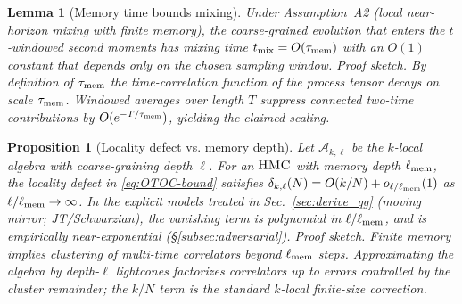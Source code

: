 \documentclass[aps,prd,preprint,onecolumn,superscriptaddress,nofootinbib,longbibliography,floatfix,11pt,showpacs,showkeys]{revtex4-2}
\newcommand{\HMC}{\textsc{HMC}\xspace}
\theoremstyle{plain}
\newtheorem{lemma}[theorem]{Lemma}
\newtheorem{proposition}[theorem]{Proposition}
\theoremstyle{definition}
\theoremstyle{remark}
\begin{document}
\begin{lemma}[Memory time bounds mixing]
\label{lem:mem-to-mix}
Under Assumption~A2 (local near-horizon mixing with finite memory), the coarse-grained evolution that enters the $t$-windowed second moments
has mixing time $t_{\rm mix}=O(\tau_{\rm mem})$ with an $O(1)$ constant that depends only on the chosen sampling window.
\emph{Proof sketch.} By definition of $\tau_{\rm mem}$ the time-correlation function of the process tensor decays on scale $\tau_{\rm mem}$.
Windowed averages over length $T$ suppress connected two-time contributions by $O(e^{-T/\tau_{\rm mem}})$, yielding the claimed scaling.
\end{lemma}

\begin{proposition}[Locality defect vs. memory depth]
\label{prop:delta-locality}
Let $\mathscr A_{k,\ell}$ be the $k$-local algebra with coarse-graining depth $\ell$. For an $\HMC{}$ with memory depth $\ell_{\rm mem}$,
the locality defect in \eqref{eq:OTOC-bound} satisfies $\delta_{k,\ell}(N)=O(k/N)+o_{\ell/\ell_{\rm mem}}(1)$ as $\ell/\ell_{\rm mem}\to\infty$.
In the explicit models treated in Sec.~\ref{sec:derive_qg} (moving mirror; JT/Schwarzian), the vanishing term is polynomial in $\ell/\ell_{\rm mem}$,
and is empirically near-exponential (\S\ref{subsec:adversarial}).
\emph{Proof sketch.} Finite memory implies clustering of multi-time correlators beyond $\ell_{\rm mem}$ steps.
Approximating the algebra by depth-$\ell$ lightcones factorizes correlators up to errors controlled by the cluster remainder;
the $k/N$ term is the standard $k$-local finite-size correction.
\end{proposition}
\end{document}
